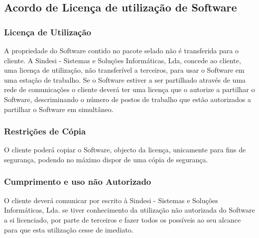 \subsection{Acordo de Licença de utilização de Software}
\subsubsection{Licença de Utilização}
A propriedade do Software contido no pacote selado não é
transferida para o cliente. A Sindesi - Sistemas e Soluções Informáticas, Lda, concede ao cliente, uma licença de
utilização, não transferível a terceiros, para usar o Software em uma estação de trabalho. Se o
Software estiver a ser partilhado através de uma rede de comunicações o cliente deverá ter uma
licença que o autorize a partilhar o Software, descriminando o número de postos de trabalho que
estão autorizados a partilhar o Software em simultâneo.


\subsubsection{Restrições de Cópia}
O cliente poderá copiar o Software, objecto da licença, unicamente
para fins de segurança, podendo no máximo dispor de uma cópia de segurança.

\subsubsection{Cumprimento e uso não Autorizado}
O cliente deverá comunicar por escrito à Sindesi - Sistemas e Soluções Informáticas, Lda.
 se tiver conhecimento da utilização não autorizada do Software a si licenciado,
por parte de terceiros e fazer todos os possíveis ao seu alcance para que esta utilização cesse
de imediato.

